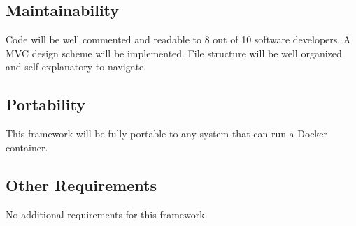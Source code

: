 \documentclass[draftclsnofoot, onecolumn, compsoc, 10pt]{IEEEtran}
\begin{document}
\subsection{Maintainability}
Code will be well commented and readable to 8 out of 10 software developers. A MVC design scheme will be implemented. File structure will be well organized and self explanatory to navigate.


\subsection{Portability}
This framework will be fully portable to any system that can run a Docker container. 

\subsection{Other Requirements}
No additional requirements for this framework.
\end{document}
